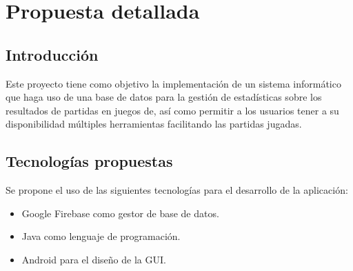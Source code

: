 \newpage

\section{Propuesta detallada}

\subsection{Introducción}\label{sec:Propuesta detallada}

Este proyecto tiene como objetivo la implementación de un sistema informático que haga uso de una base de datos para la gestión de estadísticas sobre los resultados de partidas en juegos de, así como permitir a los usuarios tener a su disponibilidad múltiples herramientas facilitando las partidas jugadas.

\subsection{Tecnologías propuestas}


Se propone el uso de las siguientes tecnologías para el desarrollo de la aplicación:

\begin{itemize}
    \item Google Firebase como gestor de base de datos.
    \item Java como lenguaje de programación.
    \item Android para el diseño de la GUI.
\end{itemize}

\newpage